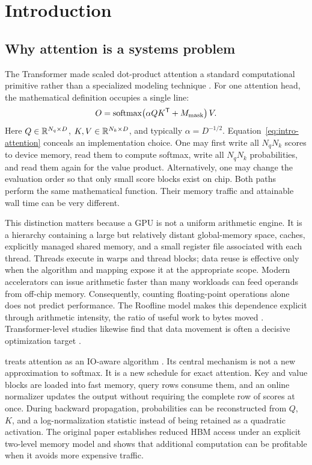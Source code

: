 \chapter{Introduction}
\label{chap:introduction}

\section{Why attention is a systems problem}

The Transformer made scaled dot-product attention a standard computational primitive rather than a specialized modeling technique \citep{vaswani2017attention}. For one attention head, the mathematical definition occupies a single line:
\begin{equation}
  O = \operatorname{softmax}\!\left(\alpha QK^{\mathsf T}+M_{\mathrm{mask}}\right)V.
  \label{eq:intro-attention}
\end{equation}
Here $Q\in\mathbb{R}^{N_q\times D}$, $K,V\in\mathbb{R}^{N_k\times D}$, and typically $\alpha=D^{-1/2}$. Equation~\eqref{eq:intro-attention} conceals an implementation choice. One may first write all $N_qN_k$ scores to device memory, read them to compute softmax, write all $N_qN_k$ probabilities, and read them again for the value product. Alternatively, one may change the evaluation order so that only small score blocks exist on chip. Both paths perform the same mathematical function. Their memory traffic and attainable wall time can be very different.

This distinction matters because a GPU is not a uniform arithmetic engine. It is a hierarchy containing a large but relatively distant global-memory space, caches, explicitly managed shared memory, and a small register file associated with each thread. Threads execute in warps and thread blocks; data reuse is effective only when the algorithm and mapping expose it at the appropriate scope. Modern accelerators can issue arithmetic faster than many workloads can feed operands from off-chip memory. Consequently, counting floating-point operations alone does not predict performance. The Roofline model makes this dependence explicit through arithmetic intensity, the ratio of useful work to bytes moved \citep{williams2009roofline}. Transformer-level studies likewise find that data movement is often a decisive optimization target \citep{ivanov2021data}.

\FA{} treats attention as an IO-aware algorithm \citep{dao2022flashattention}. Its central mechanism is not a new approximation to softmax. It is a new schedule for exact attention. Key and value blocks are loaded into fast memory, query rows consume them, and an online normalizer updates the output without requiring the complete row of scores at once. During backward propagation, probabilities can be reconstructed from $Q$, $K$, and a log-normalization statistic instead of being retained as a quadratic activation. The original paper establishes reduced HBM access under an explicit two-level memory model and shows that additional computation can be profitable when it avoids more expensive traffic.

